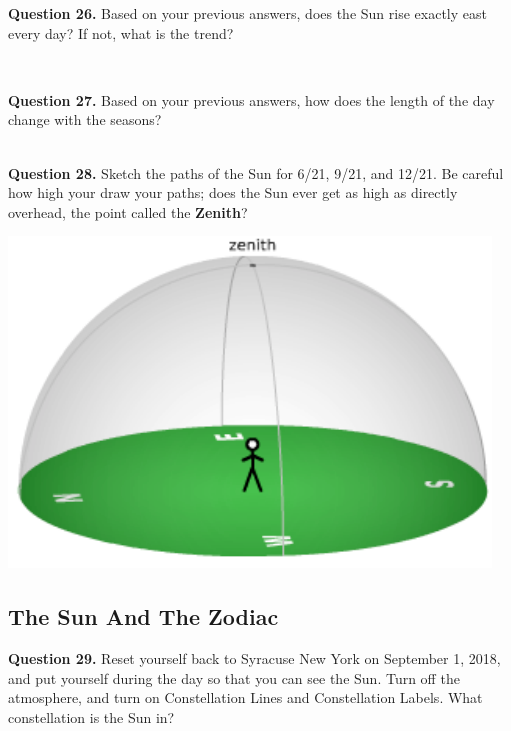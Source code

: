 \documentclass[11pt]{article}
\begin{document}
\textbf{Question 26.} Based on your previous answers, does the Sun rise exactly east every day? If not, what is the trend?\\
\vspace*{1.5cm}

\hrulefill\\

\newpage

\textbf{Question 27.} Based on your previous answers, how does the length of the day change with the seasons? \\
\vspace*{1.5cm}

\hrulefill\\

\textbf{Question 28.} Sketch the paths of the Sun for 6/21, 9/21, and 12/21. Be careful how high your draw your paths; does the Sun ever get as high as directly overhead, the point called the \textbf{Zenith}? \\
\vspace*{1.5cm}

\begin{center}
	\includegraphics{local_sky}
\end{center}

\subsection{The Sun And The Zodiac}

\textbf{Question 29.} Reset yourself back to Syracuse New York on September 1, 2018, and put yourself during the day so that you can see the Sun. Turn off the atmosphere, and turn on Constellation Lines and Constellation Labels. What constellation is the Sun in? \\
\vspace*{1.5cm}
\end{document}

